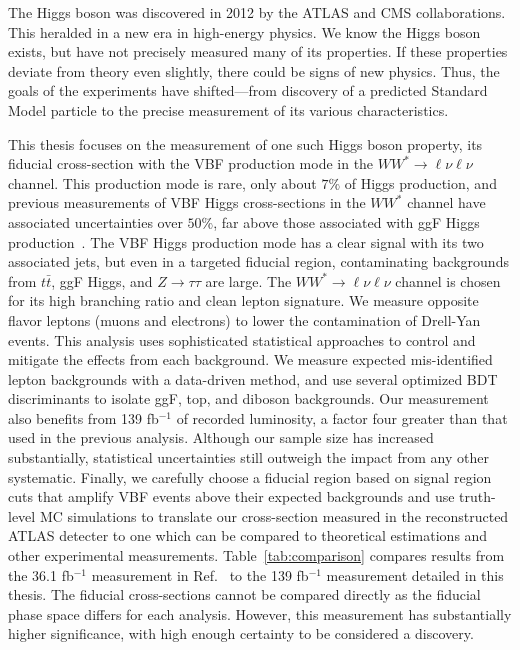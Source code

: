 The Higgs boson was discovered in 2012 by the ATLAS and CMS collaborations. This heralded in a new era in high-energy physics. We know the Higgs boson exists, but have not precisely measured many of its properties. If these properties deviate from theory even slightly, there could be signs of new physics. Thus, the goals of the experiments have shifted---from discovery of a predicted Standard Model particle to the precise measurement of its various characteristics. 

This thesis focuses on the measurement of one such Higgs boson property, its fiducial cross-section with the VBF production mode in the $WW^*\rightarrow\ell\nu\ell\nu$ channel. This production mode is rare, only about $7\%$ of Higgs production, and previous measurements of VBF Higgs cross-sections in the $WW^*$ channel have associated uncertainties over $50\%$, far above those associated with ggF Higgs production~\cite{HWW2016}. The VBF Higgs production mode has a clear signal with its two associated jets, but even in a targeted fiducial region, contaminating backgrounds from $t\bar{t}$, ggF Higgs, and $Z\rightarrow\tau\tau$ are large. The $WW^*\rightarrow \ell\nu\ell\nu$ channel is chosen for its high branching ratio and clean lepton signature. We measure opposite flavor leptons (muons and electrons) to lower the contamination of Drell-Yan events. This analysis uses sophisticated statistical approaches to control and mitigate the effects from each background. We measure expected mis-identified lepton backgrounds with a data-driven method, and use several optimized BDT discriminants to isolate ggF, top, and diboson backgrounds. Our measurement also benefits from 139 fb$^{-1}$ of recorded luminosity, a factor four greater than that used in the previous analysis. Although our sample size has increased substantially, statistical uncertainties still outweigh the impact from any other systematic. Finally, we carefully choose a fiducial region based on signal region cuts that amplify VBF events above their expected backgrounds and use truth-level MC simulations to translate our cross-section measured in the reconstructed ATLAS detecter to one which can be compared to theoretical estimations and other experimental measurements. Table~\ref{tab:comparison} compares results from the 36.1 fb$^{-1}$ measurement in Ref.~\cite{HWW2016} to the 139 fb$^{-1}$ measurement detailed in this thesis. The fiducial cross-sections cannot be compared directly as the fiducial phase space differs for each analysis. However, this measurement has substantially higher significance, with high enough certainty to be considered a discovery. 

